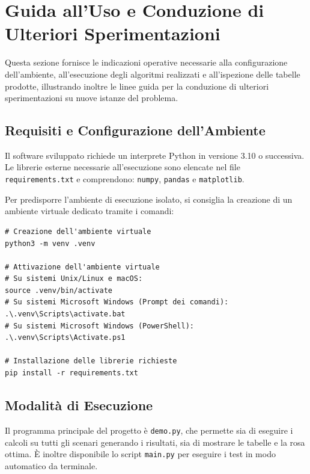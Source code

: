 \section{Guida all'Uso e Conduzione di Ulteriori Sperimentazioni}

Questa sezione fornisce le indicazioni operative necessarie alla configurazione dell'ambiente, all'esecuzione degli algoritmi realizzati e all'ispezione delle tabelle prodotte, illustrando inoltre le linee guida per la conduzione di ulteriori sperimentazioni su nuove istanze del problema.

\subsection{Requisiti e Configurazione dell'Ambiente}
Il software sviluppato richiede un interprete Python in versione 3.10 o successiva. Le librerie esterne necessarie all'esecuzione sono elencate nel file \texttt{requirements.txt} e comprendono: \texttt{numpy}, \texttt{pandas} e \texttt{matplotlib}.

Per predisporre l'ambiente di esecuzione isolato, si consiglia la creazione di un ambiente virtuale dedicato tramite i comandi:

\noindent\begin{minipage}{\linewidth}
\begin{verbatim}
# Creazione dell'ambiente virtuale
python3 -m venv .venv

# Attivazione dell'ambiente virtuale
# Su sistemi Unix/Linux e macOS:
source .venv/bin/activate
# Su sistemi Microsoft Windows (Prompt dei comandi):
.\.venv\Scripts\activate.bat
# Su sistemi Microsoft Windows (PowerShell):
.\.venv\Scripts\Activate.ps1

# Installazione delle librerie richieste
pip install -r requirements.txt
\end{verbatim}
\end{minipage}

\subsection{Modalità di Esecuzione}
Il programma principale del progetto è \texttt{demo.py}, che permette sia di eseguire i calcoli su tutti gli scenari generando i risultati, sia di mostrare le tabelle e la rosa ottima. È inoltre disponibile lo script \texttt{main.py} per eseguire i test in modo automatico da terminale.

